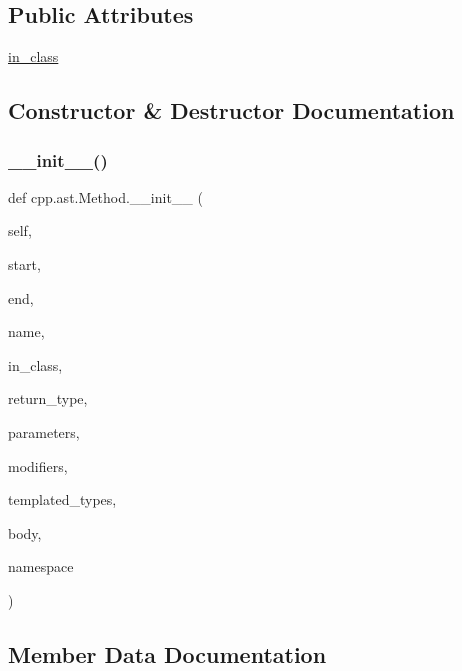 \subsection*{Public Attributes}
\begin{DoxyCompactItemize}
\item 
\mbox{\hyperlink{classcpp_1_1ast_1_1_method_aa67244c3673afed43398b5d3e3fa6c1c}{in\+\_\+class}}
\end{DoxyCompactItemize}


\subsection{Constructor \& Destructor Documentation}
\mbox{\label{classcpp_1_1ast_1_1_method_aa3cbdc9c4b7e92b15fa6acea0dbf2322}} 
\subsubsection{\texorpdfstring{\_\_init\_\_()}{\_\_init\_\_()}}
{\footnotesize\ttfamily def cpp.\+ast.\+Method.\+\_\+\+\_\+init\+\_\+\+\_\+ (\begin{DoxyParamCaption}\item[{}]{self,  }\item[{}]{start,  }\item[{}]{end,  }\item[{}]{name,  }\item[{}]{in\+\_\+class,  }\item[{}]{return\+\_\+type,  }\item[{}]{parameters,  }\item[{}]{modifiers,  }\item[{}]{templated\+\_\+types,  }\item[{}]{body,  }\item[{}]{namespace }\end{DoxyParamCaption})}



\subsection{Member Data Documentation}
\mbox{\label{classcpp_1_1ast_1_1_method_aa67244c3673afed43398b5d3e3fa6c1c}} 
